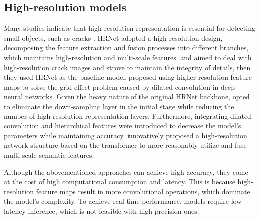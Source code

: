 \documentclass[preprint,12pt,authoryear]{elsarticle}
\begin{document}
\subsection{High-resolution models}
\label{subsec:highper}



Many studies indicate that high-resolution representation is essential for detecting small objects, such as cracks \citep{chen_automatic_2021, xu_pixel-level_2021, jia_efficient_2022, zhang_recurrent_2022}. HRNet \citep{wang_deep_2020} adopted a high-resolution design, decomposing the feature extraction and fusion processes into different branches, which maintains high-resolution and multi-scale features. \citet{xu_pixel-level_2021} and \citet{zhang_recurrent_2022} aimed to deal with high-resolution crack images and strove to maintain the integrity of details, then they used HRNet as the baseline model. \citet{tang_semantic_2021} proposed using higher-resolution feature maps to solve the grid effect problem caused by dilated convolution in deep neural networks. 
Given the heavy nature of the original HRNet backbone, \citet{chen_automatic_2021} opted to eliminate the down-sampling layer in the initial stage while reducing the number of high-resolution representation layers. Furthermore, integrating dilated convolution and hierarchical features were introduced to decrease the model's parameters while maintaining accuracy.
\citet{xiao_pavement_2023} innovatively proposed a high-resolution network structure based on the transformer to more reasonably utilize and fuse multi-scale semantic features.

Although the abovementioned approaches can achieve high accuracy, they come at the cost of high computational consumption and latency. This is because high-resolution feature maps result in more convolutional operations, which dominate the model's complexity. To achieve real-time performance, models require low-latency inference, which is not feasible with high-precision ones.
\end{document}
